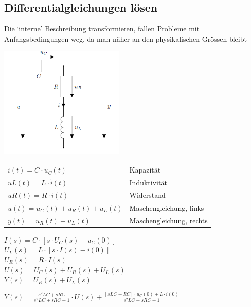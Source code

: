 \subsection{Differentialgleichungen lösen}
Die ‘interne’ Beschreibung transformieren, fallen Probleme mit Anfangsbedingungen weg, da man näher
an den physikalischen Grössen bleibt
\begin{multicols}{2}
		\begin{center}
			\includegraphics[width=6cm]{./images/diffgleichung.png}
		\end{center}
	\columnbreak
\begin{center}
	\begin{tabular}{ll}
		$i(t) = C \cdot \dot{u}_{C}(t)$ & Kapazität  \\
		$uL(t) = L \cdot \dot{i}(t)$ & Induktivität \\
		$uR(t) = R \cdot i(t)$ & Widerstand \\
		$u(t) = u_{C}(t) + u_{R}(t) + u_{L}(t)$ & Maschengleichung, links \\
		$y(t) = u_{R}(t) + u_{L}(t)$ & Maschengleichung, rechts \\
	\end{tabular}
\end{center}
\end{multicols}

\begin{multicols}{2}
{	$I(s) = C  \cdot  [s  \cdot  U_{C}(s) - u_{C}(0)]$ \\
	$U_{L}(s) = L  \cdot  [s  \cdot  I(s) - i(0)]$ \\
	$U_{R}(s) = R  \cdot  I(s)$ \\
	$U(s) = U_{C}(s) + U_{R}(s) + U_{L}(s)$ \\
	$Y (s) = U_{R}(s) + U_{L}(s)$ \\}

	\columnbreak
\begin{center}

$Y(s) = \frac{s^2 LC+sRC}{s^2 LC +sRC +1}\cdot U(s) + \frac{[sLC + RC] \cdot u_{C}(0) + L \cdot i(0)}{s^2 LC +sRC +1}$
\end{center}
\end{multicols}

